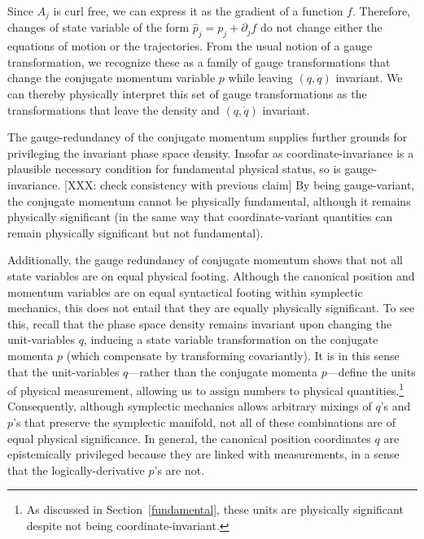 \documentclass[letterpaper]{article}
\begin{document}
Since $A_j$ is curl free, we can express it as the gradient of a function $f$. Therefore, changes of state variable of the form $\hat{p}_j = p_j + \partial_j f$ do not change either the equations of motion or the trajectories. From the usual notion of a gauge transformation, we recognize these as a family of gauge transformations that change the conjugate momentum variable $p$ while leaving $(q,\dot{q}) $ invariant. We can thereby physically interpret this set of gauge transformations as the transformations that leave the density and $(q,\dot{q}) $ invariant.

The gauge-redundancy of the conjugate momentum supplies further grounds for privileging the invariant phase space density. Insofar as coordinate-invariance is a plausible necessary condition for fundamental physical status, so is gauge-invariance. [XXX: check consistency with previous claim] By being gauge-variant, the conjugate momentum cannot be physically fundamental, although it remains physically significant (in the same way that coordinate-variant quantities can remain physically significant but not fundamental).

Additionally, the gauge redundancy of conjugate momentum shows that not all state variables are on equal physical footing. Although the canonical position and momentum variables are on equal syntactical footing within symplectic mechanics, this does not entail that they are equally physically significant. To see this, recall that the phase space density remains invariant upon changing the unit-variables $q$, inducing a state variable transformation on the conjugate momenta $p$ (which compensate by transforming covariantly). It is in this sense that the unit-variables $q$---rather than the conjugate momenta $p$---define the units of physical measurement, allowing us to assign numbers to physical quantities.\footnote{As discussed in Section~\ref{fundamental}, these units are physically significant despite not being coordinate-invariant.} Consequently, although symplectic mechanics allows arbitrary mixings of $q$'s and $p$'s that preserve the symplectic manifold, not all of these combinations are of equal physical significance. In general, the canonical position coordinates $q$ are epistemically privileged because they are linked with measurements, in a sense that the logically-derivative $p$'s are not. 



\end{document}
